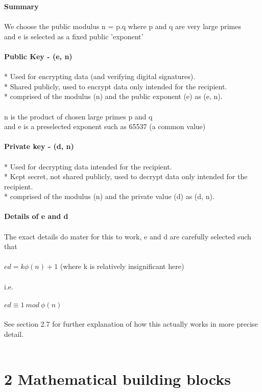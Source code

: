 \documentclass[11pt]{article}   	%
\begin{document}
\textbf{Summary} \\
\\
We choose the public modulus n = p.q where p and q are very large primes \\
and e is selected as a fixed public 'exponent' \\
\\
\textbf{Public Key - (e, n)} \\
\\
    * Used for encrypting data (and verifying digital signatures). \\
    * Shared publicly, used to encrypt data only intended for the recipient. \\
    * comprised of the modulus (n) and the public exponent (e) as (e, n). \\
\\
n is the product of chosen large primes p and q \\
and e is a preselected exponent such as 65537 (a common value) \\
\\
\textbf{Private key - (d, n)} \\
\\
    * Used for decrypting data intended for the recipient. \\
    * Kept secret, not shared publicly, used to decrypt data only intended for the recipient. \\
    * comprised of the modulus (n) and the private value (d) as (d, n). \\
\\
\textbf{Details of e and d} \\
\\
The exact details do mater for this to work, e and d are carefully selected such that \\
\\
$ ed = k\phi(n) + 1 $ (where k is relatively insignificant here) \\
\\
i.e. \\
\\
$ ed \equiv 1 \  mod \ \phi(n) $ \\
\\
See section 2.7 for further explanation of how this actually works in more precise detail. \\
\\

\break 


\section*{2 Mathematical building blocks}
\end{document}
